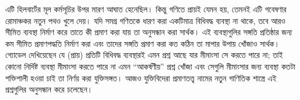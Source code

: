 \documentclass[../../../include/open-logic-section]{subfiles}
\begin{document}
এটি হিলবার্টের মূল কর্মসূচির উপর মারণ আঘাত হেনেছিল। কিন্তু গণিতে প্রায়ই যেমন
হয়, তেমনই এটি গবেষণার রোমাঞ্চকর নতুন পথও খুলে দেয়। যদি সমগ্র গণিতকে ধারণ
করা একটিমাত্র বিধিবদ্ধ ব্যবস্থা না থাকে, তবে আরও সীমিত ব্যবস্থা নির্মাণ করে
তাতে কী প্রমাণ করা যায় তা অনুসন্ধান করা সার্থক। এই ব্যবস্থাগুলির সঙ্গতি
প্রতিষ্ঠার জন্য কম সীমিত প্রমাণপদ্ধতি নির্মাণ করা এবং তাদের সঙ্গতি প্রমাণ করা
কত কঠিন তা মাপার উপায় খোঁজাও সার্থক। গ্যোডেল দেখিয়েছেন যে (প্রায়) প্রতিটি
বিধিবদ্ধ ব্যবস্থারই এমন প্রশ্ন আছে যার মীমাংসা সে করতে পারে না; তাই কোনো
নির্দিষ্ট ব্যবস্থা মীমাংসা করতে পারে না এমন ``আকর্ষণীয়'' প্রশ্ন খোঁজা এবং
সেগুলি মীমাংসার জন্য ব্যবস্থা কতটা শক্তিশালী হওয়া চাই তা নির্ণয় করা যুক্তিসঙ্গত।
আজও যুক্তিবিদেরা প্রমাণতত্ত্ব নামের নতুন গাণিতিক শাস্ত্রে এই প্রশ্নগুলির অনুসন্ধান
করে চলেছেন।
\end{document}
